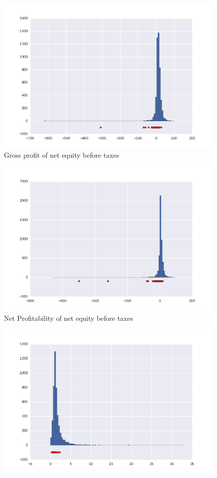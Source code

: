 \documentclass[DIV=calc, paper=a4, fontsize=11pt, twocolumn]{scrartcl}
\begin{document}
\begin{appendices}
\begin{figure}[h]
  \centering
  \includegraphics[width=0.8\linewidth]{r11}
  \caption{Gross profit of net equity before taxes}
\end{figure}
\begin{figure}[h]
  \centering
  \includegraphics[width=0.8\linewidth]{r12}
  \caption{Net Profitability of net equity before taxes}
\end{figure}
\begin{figure}[h]
    \centering
    \includegraphics[width=0.8\linewidth]{r13.png}

\end{figure}
\end{appendices}
\end{document}
